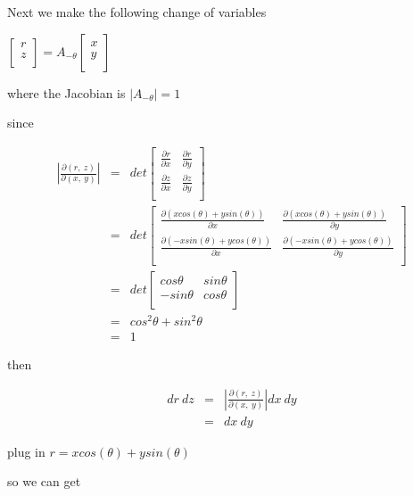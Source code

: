 \documentclass{article}
\begin{document}
Next we make the following change of variables

$\begin{bmatrix}
	r \\
	z \\
\end{bmatrix}=A_{-\theta}\begin{bmatrix}
	x \\
	y \\
\end{bmatrix}$

where the Jacobian is $|A_{-\theta}|=1$

since

\begin{eqnarray}    \label{eq2}
	{|\frac{\partial(r,\ z)}{\partial(x,\ y)}|}&=&det\begin{bmatrix}
		\frac{\partial r}{\partial x} & \frac{\partial r}{\partial y} \\
		\frac{\partial z}{\partial x} & \frac{\partial z}{\partial y} \\
	\end{bmatrix} \nonumber    \\
	~&=&det\begin{bmatrix}
		\frac{\partial (xcos(\theta)+ysin(\theta))}{\partial x} & \frac{\partial (xcos(\theta)+ysin(\theta))}{\partial y} \\
		\frac{\partial (-xsin(\theta)+ycos(\theta))}{\partial x} & \frac{\partial (-xsin(\theta)+ycos(\theta))}{\partial y} \\
	\end{bmatrix} \nonumber    \\
	~&=&det\begin{bmatrix}
		cos\theta & sin\theta \\
		-sin\theta & cos\theta\\
	\end{bmatrix} \nonumber    \\
	~&=&cos^2\theta+sin^2\theta \nonumber    \\
	~&=&1
\end{eqnarray}

then

\begin{eqnarray}    \label{eq3}
	dr\ dz&=&|\frac{\partial(r,\ z)}{\partial(x,\ y)}|dx\ dy \nonumber    \\
	~&=&dx\ dy
\end{eqnarray}

plug in $r=xcos(\theta)+ysin(\theta)$

so we can get
\end{document}
